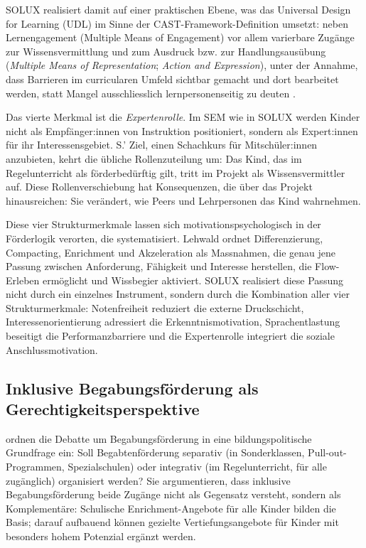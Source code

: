 \documentclass[ngerman, a4paper]{article}
\begin{document}
SOLUX realisiert damit auf einer praktischen Ebene, was das Universal Design
for Learning (UDL) im Sinne der CAST-Framework-Definition umsetzt: neben
Lernengagement (Multiple Means of Engagement) vor allem varierbare Zugänge zur
Wissensvermittlung und zum Ausdruck bzw. zur Handlungsausübung
(\textit{Multiple Means of Representation}; \textit{Action and Expression}),
unter der Annahme, dass Barrieren im curricularen Umfeld sichtbar gemacht und
dort bearbeitet werden, statt Mangel ausschliesslich lernpersonenseitig zu
deuten \parencite[Version~3.0]{cast2024udlguidelines}.

Das vierte Merkmal ist die \textit{Expertenrolle}. Im SEM wie in SOLUX werden Kinder
nicht als Empfänger:innen von Instruktion positioniert, sondern als Expert:innen
für ihr Interessensgebiet. S.' Ziel, einen Schachkurs für Mitschüler:innen
anzubieten, kehrt die übliche Rollenzuteilung um: Das Kind, das im Regelunterricht
als förderbedürftig gilt, tritt im Projekt als Wissensvermittler auf. Diese
Rollenverschiebung hat Konsequenzen, die über das Projekt hinausreichen: Sie
verändert, wie Peers und Lehrpersonen das Kind wahrnehmen.

Diese vier Strukturmerkmale lassen sich motivationspsychologisch in der
Förderlogik verorten, die \textcite[S.\,151--158]{lehwald2017motivation}
systematisiert. Lehwald ordnet Differenzierung, Compacting, Enrichment und
Akzeleration als Massnahmen, die genau jene Passung zwischen Anforderung,
Fähigkeit und Interesse herstellen, die Flow-Erleben ermöglicht und Wissbegier
aktiviert. SOLUX realisiert diese Passung nicht durch ein einzelnes Instrument,
sondern durch die Kombination aller vier Strukturmerkmale: Notenfreiheit
reduziert die externe Druckschicht, Interessenorientierung adressiert die
Erkenntnismotivation, Sprachentlastung beseitigt die Performanzbarriere und
die Expertenrolle integriert die soziale Anschlussmotivation.

\subsection{Inklusive Begabungsförderung als Gerechtigkeitsperspektive}

\textcite[S.\,290--298]{weigand2021separativ} ordnen die Debatte um Begabungsförderung in eine bildungspolitische
Grundfrage ein: Soll Begabtenförderung separativ (in Sonderklassen, Pull-out-Programmen,
Spezialschulen) oder integrativ (im Regelunterricht, für alle zugänglich) organisiert
werden? Sie argumentieren, dass inklusive Begabungsförderung beide Zugänge nicht als
Gegensatz versteht, sondern als Komplementäre: Schulische Enrichment-Angebote für alle
Kinder bilden die Basis; darauf aufbauend können gezielte Vertiefungsangebote für
Kinder mit besonders hohem Potenzial ergänzt werden.
\end{document}
